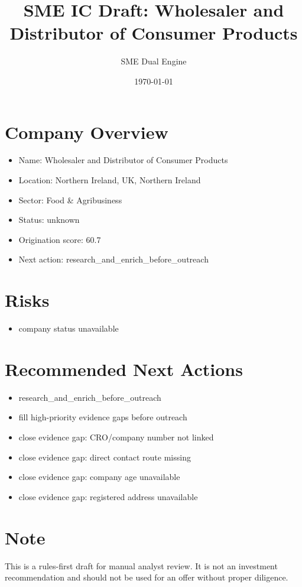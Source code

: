 \documentclass[11pt,a4paper]{article}
\title{SME IC Draft: Wholesaler and Distributor of Consumer Products}
\author{SME Dual Engine}
\date{\today}
\begin{document}
\maketitle
\section*{Company Overview}
\begin{itemize}[leftmargin=1.4em]
\item Name: Wholesaler and Distributor of Consumer Products
\item Location: Northern Ireland, UK, Northern Ireland
\item Sector: Food \& Agribusiness
\item Status: unknown
\item Origination score: 60.7
\item Next action: research\_and\_enrich\_before\_outreach
\end{itemize}
\section*{Risks}
\begin{itemize}[leftmargin=1.4em]
\item company status unavailable
\end{itemize}
\section*{Recommended Next Actions}
\begin{itemize}[leftmargin=1.4em]
\item research\_and\_enrich\_before\_outreach
\item fill high-priority evidence gaps before outreach
\item close evidence gap: CRO/company number not linked
\item close evidence gap: direct contact route missing
\item close evidence gap: company age unavailable
\item close evidence gap: registered address unavailable
\end{itemize}
\section*{Note}
This is a rules-first draft for manual analyst review. It is not an investment
recommendation and should not be used for an offer without proper diligence.
\end{document}
